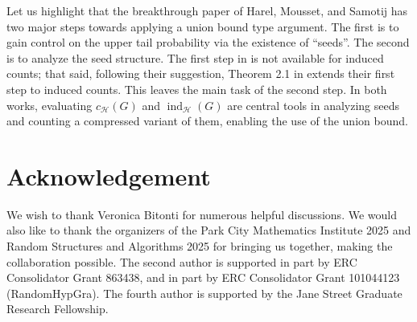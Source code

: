 \documentclass[reqno,11pt]{amsart}
\numberwithin{equation}{section}
\theoremstyle{definition}
\theoremstyle{remark}
\DeclareMathOperator{\ind}{ind}
\begin{document}
Let us highlight that the breakthrough paper of Harel, Mousset, and Samotij \cite{HarMouSam2022} has two major steps towards applying a union bound type argument. The first is to gain control on the upper tail probability via the existence of ``seeds''. The second is to analyze the seed structure. The first step in \cite{HarMouSam2022} is not available for induced counts; that said, following their suggestion, Theorem 2.1 in \cite{Coh2024} extends their first step to induced counts. This leaves the main task of the second step. In both works, evaluating $c_{\mathcal{H}}(G)$ and $\ind_{\mathcal{H}}(G)$ are central tools in analyzing seeds and counting a compressed variant of them, enabling the use of the union bound.



\section{Acknowledgement}
We wish to thank Veronica Bitonti for numerous helpful discussions.
We would also like to thank the organizers of the Park City Mathematics Institute 2025 and Random Structures and Algorithms 2025 for bringing us together, making the collaboration possible. 
The second author is supported in
part by ERC Consolidator Grant 863438, and in part by ERC Consolidator Grant 101044123 (RandomHypGra). The fourth author is supported by the Jane Street Graduate Research Fellowship.





\appendix
\end{document}
